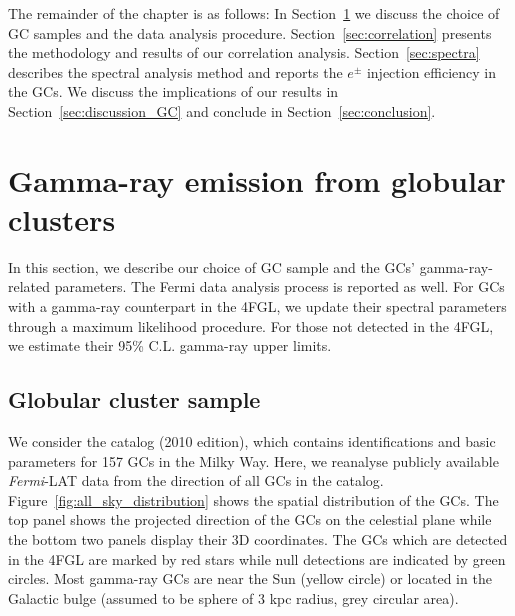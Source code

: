 \documentclass[doublespace,nopageskip]{VTthesis} %
\begin{document}
The remainder of the chapter is as follows: In Section~\ref{sec:gamma_GCs} we discuss the choice of GC samples and the data analysis procedure. Section~\ref{sec:correlation} presents the methodology and results of our correlation analysis. Section~\ref{sec:spectra} describes the spectral analysis method and reports the $e^\pm$ injection efficiency in the GCs. We discuss the implications of our results in Section~\ref{sec:discussion_GC} and conclude in Section~\ref{sec:conclusion}.

\section{Gamma-ray emission from globular clusters}\label{sec:gamma_GCs}

In this section, we describe our choice of GC sample and the GCs' gamma-ray-related parameters. The Fermi data analysis process is reported as well. For GCs with a gamma-ray counterpart in the 4FGL, we update their spectral parameters through a maximum likelihood procedure. For those not detected in the 4FGL, we estimate their 95\% C.L. gamma-ray upper limits.

\subsection{Globular cluster sample}\label{sec:samples}

We consider the \citet{1996AJ....112.1487H} catalog (2010 edition), which contains identifications and basic parameters for 157 GCs in the Milky Way. Here, we reanalyse publicly available {\it Fermi}-LAT data from the direction of all GCs in the \citet{1996AJ....112.1487H} catalog. Figure~\ref{fig:all_sky_distribution} shows the spatial distribution of the GCs. The top panel shows the projected direction of the GCs on the celestial plane while the bottom two panels display their 3D coordinates. The GCs which are detected in the 4FGL are marked by red stars while null detections are indicated by green circles. Most gamma-ray GCs are near the Sun (yellow circle) or located in the Galactic bulge (assumed to be sphere of 3 kpc radius, grey circular area).
\end{document}
